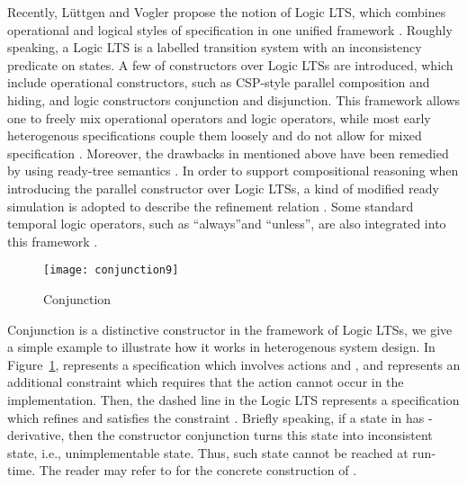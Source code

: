 \documentclass{elsarticle}
\theoremstyle{plain}
\theoremstyle{definition}
\begin{document}
    Recently, L{\"u}ttgen and Vogler propose the notion of Logic LTS, which combines operational and logical styles of specification in one unified framework \cite{Luttgen07,Luttgen10}.
    Roughly speaking, a Logic LTS is a labelled transition system with an inconsistency predicate on states.
    A few of constructors over Logic LTSs are introduced, which include operational constructors, such as CSP-style parallel composition and hiding, and logic constructors conjunction and disjunction.
    This framework allows one to freely mix operational operators and logic operators, while most early heterogenous specifications couple them loosely and do not allow for mixed specification \cite{Boudol92,Dam}.
    Moreover, the drawbacks in \cite{Cleaveland00,Cleaveland02} mentioned above have been remedied by using ready-tree semantics \cite{Luttgen07}.
    In order to support compositional reasoning when introducing the parallel constructor over Logic LTSs, a kind of modified ready simulation is adopted to describe the refinement relation \cite{Luttgen10}.
    Some standard temporal logic operators, such as \textquotedblleft always\textquotedblright and \textquotedblleft unless\textquotedblright, are also integrated into this framework \cite{Luttgen11}.

    \begin{figure}
    \begin{center}
        \texttt{[image: conjunction9]}
    \end{center}
    \caption{Conjunction}\label{F:CONJUNCTION}
    \end{figure}

    Conjunction is a distinctive constructor in the framework of Logic LTSs, we give a simple example to illustrate how it works in heterogenous system design. In Figure~\ref{F:CONJUNCTION},  represents a specification which involves actions  and , and  represents an additional constraint which requires that the action  cannot occur in the implementation.
    Then, the dashed line in the Logic LTS  represents a specification which refines  and satisfies the constraint .
    Briefly speaking, if a state in  has -derivative, then the constructor conjunction turns this state into inconsistent state, i.e., unimplementable state.
    Thus, such state cannot be reached at run-time.
    The reader may refer to \cite{Luttgen10} for the concrete construction of .
\end{document}
